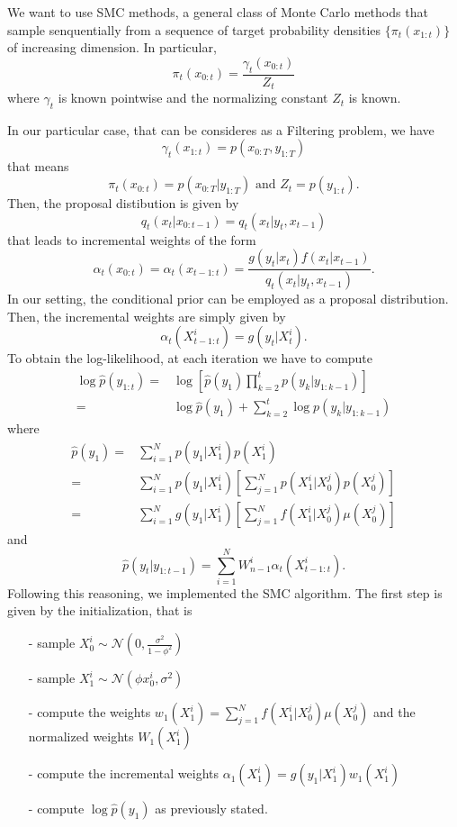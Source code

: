 \documentclass[]{article}
\begin{document}
We want to use SMC methods, a general class of Monte Carlo methods that sample senquentially from a sequence of target probability densities $\{ \pi_t(x_{1:t}) \}$ of increasing dimension. In particular, 
$$
\pi_t(x_{0:t}) = \frac{\gamma_t(x_{0:t})}{Z_t}
$$
where 
$\gamma_t$ is known pointwise and the normalizing constant $Z_t$ is known.

In our particular case, that can be consideres as a Filtering problem, we have
$$
\gamma_t(x_{1:t}) = p(x_{0:T},y_{1:T})
$$ 
that means
$$
\pi_t(x_{0:t}) = p(x_{0:T}|y_{1:T}) \text{ and } Z_t = p(y_{1:t}).
$$
Then, the proposal distibution is given by 
$$
q_t(x_t|x_{0:t-1}) = q_t(x_t|y_t, x_{t-1})
$$
that leads to incremental weights of the form
$$
\alpha_t(x_{0:t}) = \alpha_t(x_{t-1:t}) = \frac{g(y_t|x_t)f(x_t|x_{t-1})}{q_t(x_t|y_t, x_{t-1})}.  
$$
In our setting, the conditional prior can be employed as a proposal distribution. Then, the incremental weights are simply given by
$$
\alpha_t(X_{t-1:t}^i) = g(y_t|X_t^i).
$$
To obtain the log-likelihood, at each iteration we have to compute
\begin{align*}
	\log\hat{p}(y_{1:t}) = & \log[ \hat{p}(y_1) \prod_{k=2}^{t} p(y_k|y_{1:k-1})] \\
	= & \log \hat{p}(y_1) + \sum_{k=2}^{t} \log p(y_k|y_{1:k-1})
\end{align*}
where
\begin{align*}
	\hat{p}(y_1) = & \sum_{i=1}^{N} p(y_1|X_1^i)p(X_1^i) \\
	= & \sum_{i=1}^{N} p(y_1|X_1^i)[\sum_{j=1}^{N}p(X_1^i|X_0^j)p(X_0^j)] \\
	= & \sum_{i=1}^{N} g(y_1|X_1^i)[\sum_{j=1}^{N}f(X_1^i|X_0^j)\mu(X_0^j)]
\end{align*}
and
$$
\hat{p}(y_t|y_{1:t-1}) = \sum_{i=1}^{N}W_{n-1}^i\alpha_t(X_{t-1:t}^i).
$$
Following this reasoning, we implemented the SMC algorithm. The first step is given by the initialization, that is 
\begin{enumerate}
	\item[-] sample $X_0^i \sim \mathcal{N}(0, \frac{\sigma^2}{1-\phi^2})$
	\item[-] sample $X_1^i \sim \mathcal{N}(\phi x_0^i,\sigma^2) $ 
	\item[-] compute the weights $w_1(X_1^i) = \sum_{j=1}^{N}f(X_1^i|X_0^j)\mu(X_0^j)$ and the normalized weights $W_1(X_1^i)$
	\item[-] compute the incremental weights $ \alpha_1(X_1^i) = g(y_1|X_1^i)w_1(X_1^i) $
	\item[-] compute $\log \hat{p}(y_1)$ as previously stated. 
\end{enumerate}
\end{document}

